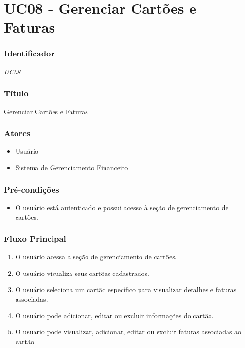 \chapter{UC08 - Gerenciar Cartões e Faturas}
\label{apendiceUC08}

\subsection*{Identificador}
\textit{UC08}

\subsection*{Título}
Gerenciar Cartões e Faturas

\subsection*{Atores}
\begin{addmargin}[1.5cm]{0cm}
	\begin{itemize}
		\item Usuário
		\item Sistema de Gerenciamento Financeiro
	\end{itemize}
\end{addmargin}

\subsection*{Pré-condições}
\begin{addmargin}[1.5cm]{0cm}
	\begin{itemize}
		\item O usuário está autenticado e possui acesso à seção de gerenciamento de cartões.
	\end{itemize}
\end{addmargin}

\subsection*{Fluxo Principal}
\begin{addmargin}[1.5cm]{0cm}
	\begin{enumerate}
		\item O usuário acessa a seção de gerenciamento de cartões.
		\item O usuário visualiza seus cartões cadastrados.
		\item O usuário seleciona um cartão específico para visualizar detalhes e faturas associadas.
		\item O usuário pode adicionar, editar ou excluir informações do cartão.
		\item O usuário pode visualizar, adicionar, editar ou excluir faturas associadas ao cartão.
	\end{enumerate}
\end{addmargin}

